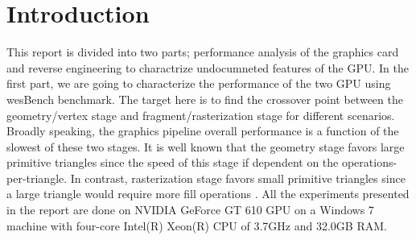 \section{Introduction}
This report is divided into two parts; performance analysis of the graphics card and reverse engineering to charactrize undocumneted features of the GPU. In the first part, we are going to characterize the performance of the two GPU using {\selectfont wesBench} benchmark. The target here is to find the crossover point between the geometry/vertex stage and fragment/rasterization stage for different scenarios. Broadly speaking, the graphics pipeline overall performance is a function of the slowest of these two stages. It is well known that the geometry stage favors large primitive triangles since the speed of this stage if dependent on the operations-per-triangle. In contrast, rasterization stage favors small primitive triangles since a large triangle would require more fill operations \cite{Bethel_2010}. All the experiments presented in the report are done on NVIDIA GeForce GT 610 GPU on a Windows 7 machine with four-core Intel(R) Xeon(R) CPU of 3.7GHz and 32.0GB RAM.
